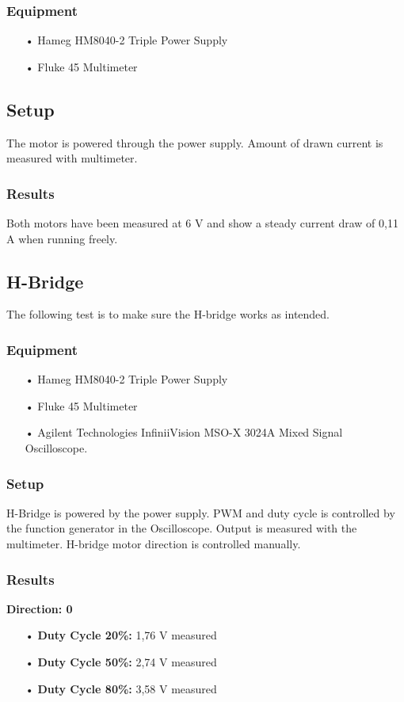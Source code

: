 \subsubsection{Equipment}
\begin{enumerate}
	\item[•]Hameg HM8040-2 Triple Power Supply
	\item[•]Fluke 45 Multimeter
\end{enumerate}

\subsection{Setup}
The motor is powered through the power supply.
Amount of drawn current is measured with multimeter.

\subsubsection{Results}
Both motors have been measured at 6 V and show a steady current draw of 0,11 A when running freely.


\subsection{H-Bridge}
The following test is to make sure the H-bridge works as intended.

\subsubsection{Equipment}
\begin{enumerate}
	\item[•]Hameg HM8040-2 Triple Power Supply
	\item[•]Fluke 45 Multimeter
	\item[•]Agilent Technologies InfiniiVision MSO-X 3024A Mixed Signal Oscilloscope.
\end{enumerate}

\subsubsection{Setup}
H-Bridge is powered by the power supply.
PWM and duty cycle is controlled by the function generator in the Oscilloscope.
Output is measured with the multimeter.
H-bridge motor direction is controlled manually.

\subsubsection{Results}
\textbf{Direction: 0}
\begin{enumerate}
	\item[•]\textbf{Duty Cycle 20\%:} 1,76 V measured
	\item[•]\textbf{Duty Cycle 50\%:} 2,74 V measured
	\item[•]\textbf{Duty Cycle 80\%:} 3,58 V measured
\end{enumerate}

